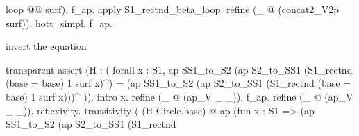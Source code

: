 \begin{coqdoccode}
\begin{coqdoccomment}
loop\coqdocindent{0.50em}
\coqdoceol
\coqdocindent{9.50em}
@@\coqdocindent{0.50em}
surf).\coqdoceol
\coqdocindent{1.00em}
f\_ap.\coqdocindent{0.50em}
apply\coqdocindent{0.50em}
S1\_rectnd\_beta\_loop.\coqdoceol
\coqdocindent{1.00em}
refine\coqdocindent{0.50em}
(\_\coqdocindent{0.50em}
@\coqdocindent{0.50em}
(concat2\_V2p\coqdocindent{0.50em}
surf)).\coqdocindent{0.50em}
hott\_simpl.\coqdocindent{0.50em}
f\_ap.\coqdoceol
\coqdoceol
\coqdoceol
\coqdocindent{1.00em}
\begin{coqdoccomment}
\coqdocindent{0.50em}
invert\coqdocindent{0.50em}
the\coqdocindent{0.50em}
equation\coqdocindent{0.50em}
\end{coqdoccomment}
\coqdoceol
\coqdocindent{1.00em}
transparent\coqdocindent{0.50em}
assert\coqdocindent{0.50em}
(H\coqdocindent{0.50em}
:\coqdocindent{0.50em}
(\coqdoceol
\coqdocindent{2.00em}
forall\coqdocindent{0.50em}
x\coqdocindent{0.50em}
:\coqdocindent{0.50em}
S1,\coqdocindent{0.50em}
\coqdoceol
\coqdocindent{3.00em}
ap\coqdocindent{0.50em}
SS1\_to\_S2\coqdocindent{0.50em}
(ap\coqdocindent{0.50em}
S2\_to\_SS1\coqdocindent{0.50em}
(S1\_rectnd\coqdocindent{0.50em}
(base\coqdocindent{0.50em}
=\coqdocindent{0.50em}
base)\coqdocindent{0.50em}
1\coqdocindent{0.50em}
surf\coqdocindent{0.50em}
x)\^{})\coqdoceol
\coqdocindent{3.00em}
=\coqdoceol
\coqdocindent{3.00em}
(ap\coqdocindent{0.50em}
SS1\_to\_S2\coqdocindent{0.50em}
(ap\coqdocindent{0.50em}
S2\_to\_SS1\coqdocindent{0.50em}
(S1\_rectnd\coqdocindent{0.50em}
(base\coqdocindent{0.50em}
=\coqdocindent{0.50em}
base)\coqdocindent{0.50em}
1\coqdocindent{0.50em}
surf\coqdocindent{0.50em}
x)))\^{}\coqdoceol
\coqdocindent{1.00em}
)).\coqdoceol
\coqdocindent{1.00em}
intro\coqdocindent{0.50em}
x.\coqdoceol
\coqdocindent{1.00em}
refine\coqdocindent{0.50em}
(\_\coqdocindent{0.50em}
@\coqdocindent{0.50em}
(ap\_V\coqdocindent{0.50em}
\_\coqdocindent{0.50em}
\_)).\coqdocindent{0.50em}
f\_ap.\coqdoceol
\coqdocindent{1.00em}
refine\coqdocindent{0.50em}
(\_\coqdocindent{0.50em}
@\coqdocindent{0.50em}
(ap\_V\coqdocindent{0.50em}
\_\coqdocindent{0.50em}
\_)).\coqdocindent{0.50em}
reflexivity.\coqdoceol
\coqdocindent{1.00em}
transitivity\coqdocindent{0.50em}
(\coqdoceol
\coqdocindent{3.00em}
(H\coqdocindent{0.50em}
Circle.base)\coqdoceol
\coqdocindent{3.00em}
@\coqdocindent{0.50em}
ap\coqdocindent{0.50em}
(fun\coqdocindent{0.50em}
x\coqdocindent{0.50em}
:\coqdocindent{0.50em}
S1\coqdocindent{0.50em}
=>\coqdocindent{0.50em}
(ap\coqdocindent{0.50em}
SS1\_to\_S2\coqdocindent{0.50em}
(ap\coqdocindent{0.50em}
S2\_to\_SS1\coqdocindent{0.50em}
(S1\_rectnd\coqdocindent{0.50em}

\end{coqdoccomment}
\end{coqdoccode}
